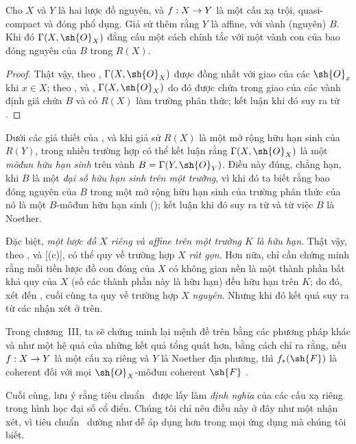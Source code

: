 \documentclass[oneside,10pt]{amsart}
\makeatletter
\newcommand{\ega@arrow}[2]{\mathchoice{#1}{#2}{#2}{#2}}
\renewcommand{\to}{\ega@arrow{\longrightarrow}{\rightarrow}}
\let\EGAOriginalLabel\label
\renewcommand{\label}[1]{\phantomsection\EGAOriginalLabel{#1}}
\makeatother
\begin{document}
\begin{corollary}[7.3.11]
\label{II.7.3.11}
Cho $X$ và $Y$ là hai lược đồ nguyên, và $f:X\to Y$ là một cấu xạ trội, quasi-compact và đóng phổ dụng.
Giả sử thêm rằng $Y$ là affine, với vành (nguyên) $B$.
Khi đó $\Gamma(X,\sh{O}_X)$ đẳng cấu một cách chính tắc với một vành con của bao đóng nguyên của $B$ trong $R(X)$.
\end{corollary}

\begin{proof}
Thật vậy, theo , $\Gamma(X,\sh{O}_X)$ được đồng nhất với giao của các $\sh{O}_x$ khi $x\in X$;
theo ,  và , $\Gamma(X,\sh{O}_X)$ do đó được chứa trong giao của các vành định giá chứa $B$ và có $R(X)$ làm trường phân thức;
kết luận khi đó suy ra từ .
\end{proof}

\begin{remarks}[7.3.12]
\label{II.7.3.12}
Dưới các giả thiết của , và khi giả sử $R(X)$ là một mở rộng hữu hạn sinh của $R(Y)$, trong nhiều trường hợp có thể kết luận rằng $\Gamma(X,\sh{O}_X)$ là một \emph{môđun hữu hạn sinh} trên vành $B=\Gamma(Y,\sh{O}_Y)$.
Điều này đúng, chẳng hạn, khi $B$ là một \emph{đại số hữu hạn sinh trên một trường}, vì khi đó ta biết rằng bao đóng nguyên của $B$ trong một mở rộng hữu hạn sinh của trường phân thức của nó là một $B$-môđun hữu hạn sinh (\cite[t.~I, p.~267, th.~9]{I-13});
kết luận khi đó suy ra từ  và từ việc $B$ là Noether.

Đặc biệt, \emph{một lược đồ $X$ riêng và affine trên một trường $K$ là hữu hạn}.
Thật vậy, theo ,  và [(c)], có thể quy về trường hợp $X$ \emph{rút gọn}.
Hơn nữa, chỉ cần chứng minh rằng mỗi tiền lược đồ con đóng của $X$ có không gian nền là một thành phần bất khả quy của $X$ (số các thành phần này là hữu hạn) đều hữu hạn trên $K$; do đó, xét đến , cuối cùng ta quy về trường hợp $X$ \emph{nguyên}.
Nhưng khi đó kết quả suy ra từ các nhận xét ở trên.

Trong chương~III, ta sẽ chứng minh lại mệnh đề trên bằng các phương pháp khác và như một hệ quả của những kết quả tổng quát hơn, bằng cách chỉ ra rằng, nếu $f:X\to Y$ là một cấu xạ riêng và $Y$ là Noether địa phương, thì $f_*(\sh{F})$ là coherent đối với mọi $\sh{O}_X$-môđun coherent $\sh{F}$ .

Cuối cùng, lưu ý rằng tiêu chuẩn~ được lấy làm \emph{định nghĩa} của các cấu xạ riêng trong hình học đại số cổ điển.
Chúng tôi chỉ nêu điều này ở đây như một nhận xét, vì tiêu chuẩn~ dường như dễ áp dụng hơn trong mọi ứng dụng mà chúng tôi biết.
\end{remarks}
\end{document}
